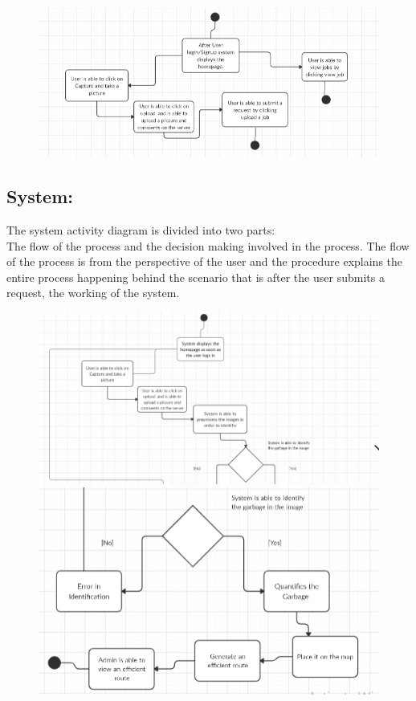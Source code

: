 \begin{figure}[!hb]
   \centering

   \includegraphics[scale=0.4]{images/User_3.PNG}
\end{figure}
\newpage
\subsection{System:}
The system activity diagram is divided into two parts: \\
The flow of the process and the decision making involved in the process. The flow of the process is from  the perspective of the user and the procedure explains the entire process happening behind the scenario that is after the user submits a request, the working of the system.

\begin{figure}[!hb]
   \centering

   \includegraphics[scale=0.6]{images/UserSystem_1.PNG}
   \includegraphics[scale=0.6]{images/UserSystem_2.PNG}
   
\end{figure}

